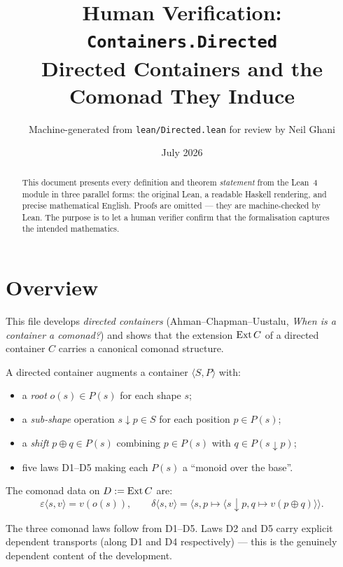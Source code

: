 \documentclass[11pt,a4paper]{article}
\title{Human Verification: \texttt{Containers.Directed}\\[4pt]
  \large Directed Containers and the Comonad They Induce}
\author{Machine-generated from \texttt{lean/Directed.lean} for review by Neil Ghani}
\date{July 2026}
\begin{document}
\maketitle

\begin{abstract}
This document presents every definition and theorem \emph{statement} from the
Lean~4 module  in three parallel forms: the original
Lean, a readable Haskell rendering, and precise mathematical English.  Proofs
are omitted --- they are machine-checked by Lean.  The purpose is to let a
human verifier confirm that the formalisation captures the intended mathematics.
\end{abstract}

\tableofcontents
\bigskip

\section{Overview}

This file develops \emph{directed containers} (Ahman--Chapman--Uustalu,
\emph{When is a container a comonad?}) and shows that the extension $\mathrm{Ext}\,C$
of a directed container $C$ carries a canonical comonad structure.

A directed container augments a container $\langle S, P \rangle$ with:
\begin{itemize}
  \item a \emph{root} $o(s) \in P(s)$ for each shape $s$;
  \item a \emph{sub-shape} operation $s \downarrow p \in S$ for each position
        $p \in P(s)$;
  \item a \emph{shift} $p \oplus q \in P(s)$ combining $p \in P(s)$ with
        $q \in P(s \downarrow p)$;
  \item five laws D1--D5 making each $P(s)$ a ``monoid over the base''.
\end{itemize}

\noindent The comonad data on $D := \mathrm{Ext}\,C$ are:
\[
  \varepsilon\langle s, v \rangle = v(o(s)), \qquad
  \delta\langle s, v \rangle = \langle s, p \mapsto \langle s \downarrow p,
    q \mapsto v(p \oplus q) \rangle \rangle.
\]

The three comonad laws follow from D1--D5.  Laws D2 and D5 carry explicit
dependent transports (along D1 and D4 respectively) --- this is the genuinely
dependent content of the development.
\end{document}
